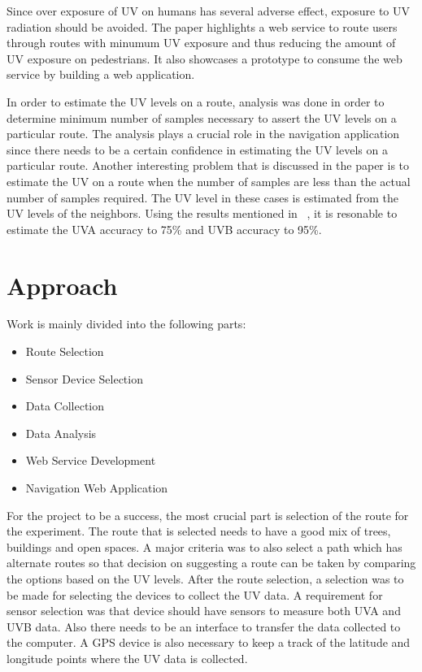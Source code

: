 \documentclass[10pt]{sigplan-proc-varsize}
\begin{document}
Since over exposure of UV on humans has several adverse effect, exposure to UV radiation should be avoided. The paper highlights a web service to route users through routes with minumum UV exposure and thus reducing the amount of UV exposure on pedestrians. It also showcases a prototype to consume the web service by building a web application. 

In order to estimate the UV levels on a route, analysis was done in order to determine minimum number of samples necessary to assert the UV levels on a particular route. The analysis plays a crucial role in the navigation application since there needs to be a certain confidence in estimating the UV levels on a particular route. Another interesting problem that is discussed in the paper is to estimate the UV on a route when the number of samples are less than the actual number of samples required. The UV level in these cases is estimated from the UV levels of the neighbors. Using the results mentioned in ~\cite{uvguardian}, it is resonable to estimate the UVA accuracy to 75\% and UVB accuracy to 95\%. 


\section{Approach}
Work is mainly divided into the following parts:
\begin{itemize}
\item{Route Selection}
\item{Sensor Device Selection}
\item{Data Collection}
\item{Data Analysis}
\item{Web Service Development}
\item{Navigation Web Application}
\end{itemize}
For the project to be a success, the most crucial part is selection of the route for the experiment. The route that is selected needs to have a good mix of trees, buildings and open spaces. A major criteria was to also select a path which has alternate routes so that decision on suggesting a route can be taken by comparing the options based on the UV levels. After the route selection, a selection was to be made for selecting the devices to collect the UV data. A requirement for sensor selection was that device should have sensors to measure both UVA and UVB data. Also there needs to be an interface to transfer the data collected to the computer.  A GPS device is also necessary to keep a track of the latitude and longitude points where the UV data is collected.  
\end{document}
